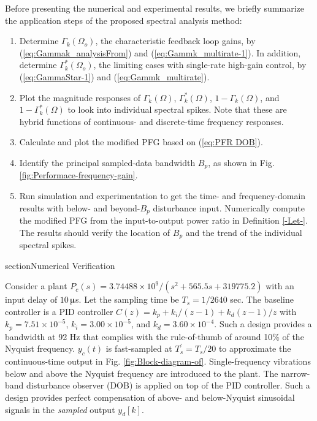 \documentclass [11pt, proquest] {uwthesis}[2020/02/24]
\begin{document}
Before presenting the numerical and experimental results, we briefly
summarize the application steps of the proposed spectral analysis
method:
\begin{enumerate}
\item Determine $\Gamma_{k}(\Omega_{o})$, the characteristic feedback loop
gains, by (\ref{eq:Gammak_analysisFrom}) and (\ref{eq:Gammk_multirate-1}).
In addition, determine $\Gamma_{k}^{*}(\Omega_{o})$, the limiting
cases with single-rate high-gain control, by (\ref{eq:GammaStar-1})
and (\ref{eq:Gammk_multirate}).
\item Plot the magnitude responses of $\Gamma_{k}(\Omega)$, $\Gamma_{k}^{*}(\Omega)$,
$1-\Gamma_{k}(\Omega)$, and $1-\Gamma_{k}^{*}(\Omega)$ to look into
individual spectral spikes. Note that these are hybrid functions of
continuous- and discrete-time frequency responses.
\item Calculate and plot the modified PFG based on (\ref{eq:PFR DOB}).
\item Identify the principal sampled-data bandwidth $B_{p}$, as shown in
Fig. \ref{fig:Performace-frequency-gain}.
\item Run simulation and experimentation to get the time- and frequency-domain
results with below- and beyond-$B_{p}$ disturbance input. Numerically
compute the modified PFG from the input-to-output power ratio in Definition
\ref{-Let-}. The results should verify the location of $B_{p}$ and
the trend of the individual spectral spikes.
\end{enumerate}

section{Numerical Verification\label{sec:Numerical-Verification}}

Consider a plant $P_{c}(s)=3.74488\times10^{9}/(s^{2}+565.5s+319775.2)$
with an input delay of $10\,$$\muup$s. Let the sampling time
be $T_{s}=1/2640$ sec. The baseline controller is a PID controller
$C(z)=k_{p}+k_{i}/(z-1)+k_{d}(z-1)/z$ with $k_{p}=7.51\times10^{-5}$,
$k_{i}=3.00\times10^{-5}$, and $k_{d}=3.60\times10^{-4}$. Such a
design provides a bandwidth at 92 Hz that complies with the rule-of-thumb
of around 10\% of the Nyquist frequency. $y_{c}(t)$ is fast-sampled
at $T_{s}^{'}=T_{s}/20$ to approximate the continuous-time output
in Fig. \ref{fig:Block-diagram-of}. Single-frequency vibrations below
and above the Nyquist frequency are introduced to the plant. The narrow-band
disturbance observer (DOB) \cite{XuChen_TCST2012} is applied on top
of the PID controller. Such a design provides perfect compensation
of above- and below-Nyquist sinusoidal signals in the \emph{sampled}
output $y_{d}[k]$. 
\end{document}
